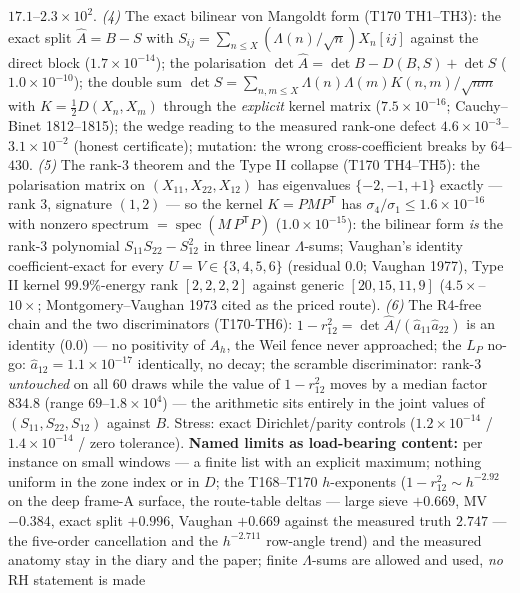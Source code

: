 $17.1$--$2.3\times10^{2}$.
\emph{(4)} The exact bilinear von Mangoldt form (T170 TH1--TH3): the
exact split $\hat A=B-S$ with $S_{ij}=\sum_{n\le X}(\Lambda(n)/\sqrt n)
X_n[ij]$ against the direct block ($1.7\times10^{-14}$); the
polarisation $\det\hat A=\det B-D(B,S)+\det S$ ($1.0\times10^{-10}$);
the double sum $\det S=\sum_{n,m\le X}\Lambda(n)\Lambda(m)K(n,m)/
\sqrt{nm}$ with $K=\tfrac12D(X_n,X_m)$ through the \emph{explicit}
kernel matrix ($7.5\times10^{-16}$; Cauchy--Binet 1812--1815); the
wedge reading to the measured rank-one defect
$4.6\times10^{-3}$--$3.1\times10^{-2}$ (honest certificate); mutation:
the wrong cross-coefficient breaks by $64$--$430$.
\emph{(5)} The rank-3 theorem and the Type II collapse (T170 TH4--TH5):
the polarisation matrix on $(X_{11},X_{22},X_{12})$ has eigenvalues
$\{-2,-1,+1\}$ exactly --- rank $3$, signature $(1,2)$ --- so the kernel
$K=PMP^{\mathsf T}$ has $\sigma_4/\sigma_1\le1.6\times10^{-16}$ with
nonzero spectrum $=\operatorname{spec}(M\,P^{\mathsf T}P)$
($1.0\times10^{-15}$): the bilinear form \emph{is} the rank-3 polynomial
$S_{11}S_{22}-S_{12}^2$ in three linear $\Lambda$-sums; Vaughan's
identity coefficient-exact for every $U=V\in\{3,4,5,6\}$ (residual
$0.0$; Vaughan 1977), Type II kernel $99.9\%$-energy rank $[2,2,2,2]$
against generic $[20,15,11,9]$ ($4.5\times$--$10\times$;
Montgomery--Vaughan 1973 cited as the priced route).
\emph{(6)} The R4-free chain and the two discriminators (T170-TH6):
$1-r_{12}^2=\det\hat A/(\hat a_{11}\hat a_{22})$ is an identity ($0.0$)
--- no positivity of $A_h$, the Weil fence never approached; the $L_P$
no-go: $\hat a_{12}=1.1\times10^{-17}$ identically, no decay; the
scramble discriminator: rank-3 \emph{untouched} on all $60$ draws while
the value of $1-r_{12}^2$ moves by a median factor $834.8$ (range
$69$--$1.8\times10^{4}$) --- the arithmetic sits entirely in the joint
values of $(S_{11},S_{22},S_{12})$ against $B$. Stress: exact
Dirichlet/parity controls ($1.2\times10^{-14}$ / $1.4\times10^{-14}$ /
zero tolerance).
\textbf{Named limits as load-bearing content:} per instance on small
windows --- a finite list with an explicit maximum; nothing uniform in
the zone index or in $D$; the T168--T170 $h$-exponents
($1-r_{12}^2\sim h^{-2.92}$ on the deep frame-A surface, the
route-table deltas --- large sieve $+0.669$, MV $-0.384$, exact split
$+0.996$, Vaughan $+0.669$ against the measured truth $2.747$ --- the
five-order cancellation and the $h^{-2.711}$ row-angle trend) and the
measured anatomy stay in the diary and the paper; finite
$\Lambda$-sums are allowed and used, \emph{no} RH statement is made
